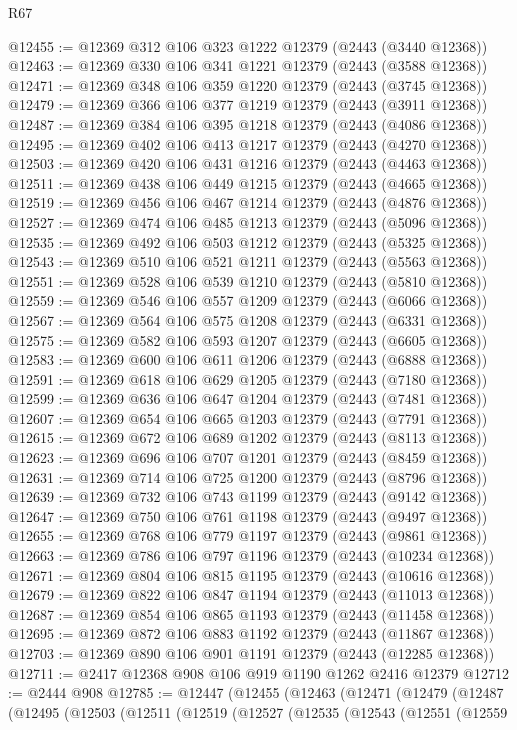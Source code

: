 \begin{lexlean}{R67}
\begin{coremodule}
@12455 := @12369 @312 @106 @323 @1222 @12379 (@2443 (@3440 @12368))
@12463 := @12369 @330 @106 @341 @1221 @12379 (@2443 (@3588 @12368))
@12471 := @12369 @348 @106 @359 @1220 @12379 (@2443 (@3745 @12368))
@12479 := @12369 @366 @106 @377 @1219 @12379 (@2443 (@3911 @12368))
@12487 := @12369 @384 @106 @395 @1218 @12379 (@2443 (@4086 @12368))
@12495 := @12369 @402 @106 @413 @1217 @12379 (@2443 (@4270 @12368))
@12503 := @12369 @420 @106 @431 @1216 @12379 (@2443 (@4463 @12368))
@12511 := @12369 @438 @106 @449 @1215 @12379 (@2443 (@4665 @12368))
@12519 := @12369 @456 @106 @467 @1214 @12379 (@2443 (@4876 @12368))
@12527 := @12369 @474 @106 @485 @1213 @12379 (@2443 (@5096 @12368))
@12535 := @12369 @492 @106 @503 @1212 @12379 (@2443 (@5325 @12368))
@12543 := @12369 @510 @106 @521 @1211 @12379 (@2443 (@5563 @12368))
@12551 := @12369 @528 @106 @539 @1210 @12379 (@2443 (@5810 @12368))
@12559 := @12369 @546 @106 @557 @1209 @12379 (@2443 (@6066 @12368))
@12567 := @12369 @564 @106 @575 @1208 @12379 (@2443 (@6331 @12368))
@12575 := @12369 @582 @106 @593 @1207 @12379 (@2443 (@6605 @12368))
@12583 := @12369 @600 @106 @611 @1206 @12379 (@2443 (@6888 @12368))
@12591 := @12369 @618 @106 @629 @1205 @12379 (@2443 (@7180 @12368))
@12599 := @12369 @636 @106 @647 @1204 @12379 (@2443 (@7481 @12368))
@12607 := @12369 @654 @106 @665 @1203 @12379 (@2443 (@7791 @12368))
@12615 := @12369 @672 @106 @689 @1202 @12379 (@2443 (@8113 @12368))
@12623 := @12369 @696 @106 @707 @1201 @12379 (@2443 (@8459 @12368))
@12631 := @12369 @714 @106 @725 @1200 @12379 (@2443 (@8796 @12368))
@12639 := @12369 @732 @106 @743 @1199 @12379 (@2443 (@9142 @12368))
@12647 := @12369 @750 @106 @761 @1198 @12379 (@2443 (@9497 @12368))
@12655 := @12369 @768 @106 @779 @1197 @12379 (@2443 (@9861 @12368))
@12663 := @12369 @786 @106 @797 @1196 @12379 (@2443 (@10234 @12368))
@12671 := @12369 @804 @106 @815 @1195 @12379 (@2443 (@10616 @12368))
@12679 := @12369 @822 @106 @847 @1194 @12379 (@2443 (@11013 @12368))
@12687 := @12369 @854 @106 @865 @1193 @12379 (@2443 (@11458 @12368))
@12695 := @12369 @872 @106 @883 @1192 @12379 (@2443 (@11867 @12368))
@12703 := @12369 @890 @106 @901 @1191 @12379 (@2443 (@12285 @12368))
@12711 := @2417 @12368 @908 @106 @919 @1190 @1262 @2416 @12379
@12712 := @2444 @908
@12785 := @12447
    (@12455
      (@12463
        (@12471
          (@12479
            (@12487
              (@12495
                (@12503
                  (@12511
                    (@12519
                      (@12527
                        (@12535
                          (@12543
                            (@12551
                              (@12559

\end{coremodule}
\end{lexlean}
